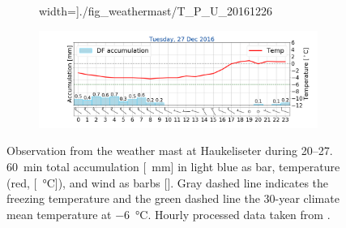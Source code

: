 \begin{figure}[h!]
\begin{subfigure}[b]{0.49\textwidth}
		width=\textwidth]{./fig_weathermast/T_P_U_20161226}
		\caption{}\label{fig:TPU26}
	\end{subfigure}
	\hfill
	\begin{subfigure}[b]{0.49\textwidth}
		\includegraphics[trim={4.9cm 1.cm 1.5cm 1cm},clip,
		width=\textwidth]{./fig_weathermast/T_P_U_20161227}
		\caption{}\label{fig:TPU27}
	\end{subfigure}
	\caption{Observation from the weather mast at Haukeliseter during \SIrange{20}{27}{\dec}. \SI{60}{\minute} total accumulation [\SI{}{\mm}] in light blue as bar, temperature (red, [\SI{}{\celsius}]), and wind as barbs [\SI{}{\mPs}]. Gray dashed line indicates the freezing temperature and the green dashed line the 30-year climate mean temperature at \SI{-6}{\celsius}. Hourly processed data taken from \cite{eklima_norwegian_2016}.} \label{fig:TPU}
\end{figure}